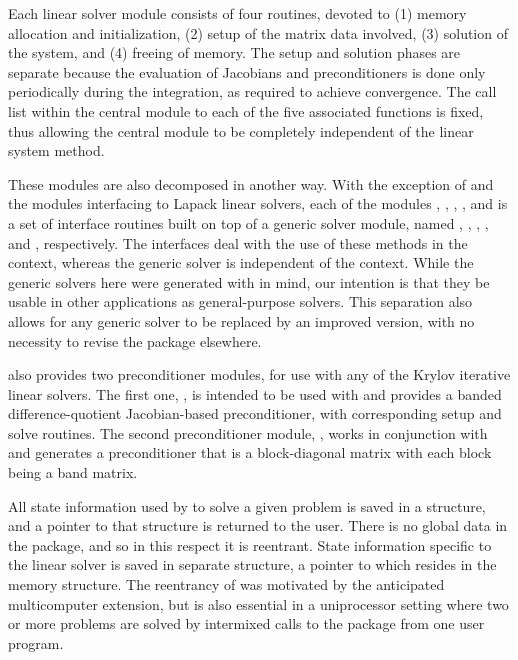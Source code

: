 Each {\cvode} linear solver module consists of four routines, devoted to (1)
memory allocation and initialization, (2) setup of the matrix data
involved, (3) solution of the system, and (4) freeing of memory.  
The setup and solution phases are separate because the evaluation of
Jacobians and preconditioners is done only periodically during the
integration, as required to achieve convergence. The call list within
the central {\cvode} module to each of the five associated functions is
fixed, thus allowing the central module to be completely independent
of the linear system method.

These modules are also decomposed in another way.
With the exception of {\cvdiag} and the modules interfacing to Lapack linear solvers,
each of the modules {\cvdense}, {\cvband}, {\cvspgmr}, {\cvspbcg}, and {\cvsptfqmr}
is a set of  interface routines built on top of a generic solver module, 
named {\dense}, {\band}, {\spgmr}, {\spbcg}, and {\sptfqmr}, respectively.  
The interfaces deal with the use of these methods in the {\cvode} context, 
whereas the generic solver is independent of the context.
While the generic solvers here were generated with {\sundials} in mind, our
intention is that they be usable in other applications as
general-purpose solvers.  This separation also allows for any generic
solver to be replaced by an improved version, with no necessity to
revise the {\cvode} package elsewhere.

{\cvode} also provides two preconditioner modules, for use with any of
the Krylov iterative linear solvers. The first one, {\cvbandpre},
is intended to be used with {\nvecs} and provides a banded
difference-quotient Jacobian-based preconditioner, with corresponding
setup and solve routines.
The second preconditioner module, {\cvbbdpre}, works in conjunction
with {\nvecp} and generates a preconditioner that is a block-diagonal
matrix with each block being a band matrix.

All state information used by {\cvode} to solve a given problem is saved
in a structure, and a pointer to that structure is returned to the
user.  There is no global data in the {\cvode} package, and so in this
respect it is reentrant. State information specific to the linear
solver is saved in separate structure, a pointer to which resides in
the {\cvode} memory structure. The reentrancy of {\cvode} was motivated
by the anticipated multicomputer extension, but is also essential
in a uniprocessor setting where two or more problems are solved by
intermixed calls to the package from one user program.

